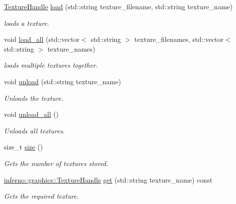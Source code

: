 \begin{DoxyCompactItemize}
\mbox{\hyperlink{namespaceinferno_1_1graphics_a9d719bfbfedd17b9ace9b8d603ab5a38}{Texture\+Handle}} \mbox{\hyperlink{classinferno_1_1graphics_1_1_texture_manager_ab3a97b088af8a322cd88b0fe4c57a350}{load}} (std\+::string texture\+\_\+filename, std\+::string texture\+\_\+name)
\begin{DoxyCompactList}\small\item\em loads a texture. \end{DoxyCompactList}\item 
void \mbox{\hyperlink{classinferno_1_1graphics_1_1_texture_manager_a66e9bc4c559810895c3ecc96ed0d4158}{load\+\_\+all}} (std\+::vector$<$ std\+::string $>$ texture\+\_\+filenames, std\+::vector$<$ std\+::string $>$ texture\+\_\+names)
\begin{DoxyCompactList}\small\item\em loads multiple textures together. \end{DoxyCompactList}\item 
void \mbox{\hyperlink{classinferno_1_1graphics_1_1_texture_manager_aac47c766334941a083ba67d0644249a7}{unload}} (std\+::string texture\+\_\+name)
\begin{DoxyCompactList}\small\item\em Unloads the texture. \end{DoxyCompactList}\item 
void \mbox{\hyperlink{classinferno_1_1graphics_1_1_texture_manager_a0ff600b700bbc566caeb7055fd26f708}{unload\+\_\+all}} ()
\begin{DoxyCompactList}\small\item\em Unloads all textures. \end{DoxyCompactList}\item 
size\+\_\+t \mbox{\hyperlink{classinferno_1_1graphics_1_1_texture_manager_a7b5b7ee8f6c1a65f63de017a933549ef}{size}} ()
\begin{DoxyCompactList}\small\item\em Gets the number of textures stored. \end{DoxyCompactList}\item 
\mbox{\hyperlink{namespaceinferno_1_1graphics_a9d719bfbfedd17b9ace9b8d603ab5a38}{inferno\+::graphics\+::\+Texture\+Handle}} \mbox{\hyperlink{classinferno_1_1graphics_1_1_texture_manager_abdd3884349f80b53a7451fb3cc94dc8d}{get}} (std\+::string texture\+\_\+name) const
\begin{DoxyCompactList}\small\item\em Gets the required texture. \end{DoxyCompactList}\item 

\end{DoxyCompactItemize}
